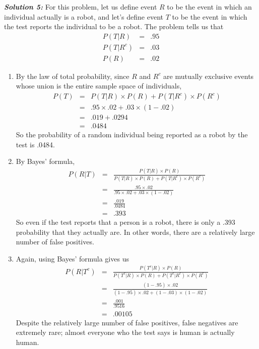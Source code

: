 \documentclass[10pt]{amsart}
\begin{document}
\noindent \textit{\textbf{Solution 5:}} For this problem, let us define event $R$ to be the event in which an individual actually is a robot, and let's define event $T$ to be the event in which the test reports the individual to be a robot. The problem tells us that
\begin{eqnarray*}
P(T|R) &=& .95 \\
P(T|R^c) &=& .03 \\
P(R) &=& .02 
\end{eqnarray*}
\begin{enumerate}

\item By the law of total probability, since $R$ and $R^c$ are mutually exclusive events whose union is the entire sample space of individuals,
\begin{eqnarray*}
P(T) &=& P(T|R) \times P(R) + P(T|R^c) \times P(R^c) \\
&=& .95 \times .02 + .03 \times (1-.02) \\
&=& .019 + .0294 \\
&=& .0484
\end{eqnarray*} 
So the probability of a random individual being reported as a robot by the test is .0484.
\medskip
\item
By Bayes' formula, 
\begin{eqnarray*}
P(R|T) &=& \frac{P(T|R) \times P(R)}{P(T|R) \times P(R) + P(T|R^c) \times P(R^c)} \\
&=& \frac{.95 \times .02}{.95 \times .02+.03 \times (1-.02)} \\
&=& \frac{.019}{.0484} \\
&=& .393
\end{eqnarray*}
So even if the test reports that a person is a robot, there is only a .393 probability that they actually are. In other words, there are a relatively large number of false positives. 
\medskip
\item
Again, using Bayes' formula gives us
\begin{eqnarray*}
P(R|T^c) &=& \frac{P(T^c|R) \times P(R)}{P(T^c|R) \times P(R) + P(T^c|R^c) \times P(R^c)} \\
&=& \frac{(1-.95) \times .02}{(1-.95) \times .02 + (1-.03) \times (1-.02)} \\
&=& \frac{.001}{.9516} \\
&=& .00105
\end{eqnarray*}
Despite the relatively large number of false positives, false negatives are extremely rare; almost everyone who the test says is human is actually human.

\end{enumerate}
\end{document}
